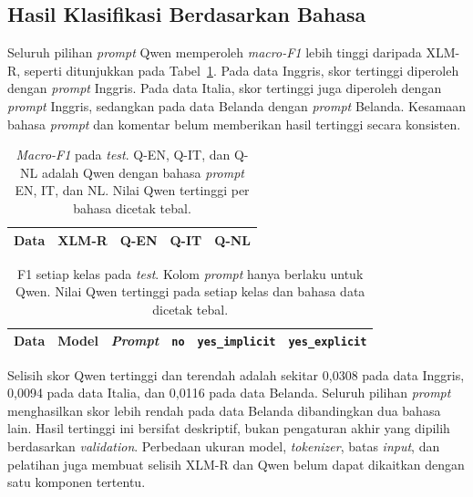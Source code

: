 \documentclass[11pt]{article}
\begin{document}
\subsection{Hasil Klasifikasi Berdasarkan Bahasa}
Seluruh pilihan \textit{prompt} Qwen memperoleh \textit{macro-F1} lebih tinggi daripada XLM-R, seperti ditunjukkan pada Tabel~\ref{tab:main}. Pada data Inggris, skor tertinggi diperoleh dengan \textit{prompt} Inggris. Pada data Italia, skor tertinggi juga diperoleh dengan \textit{prompt} Inggris, sedangkan pada data Belanda dengan \textit{prompt} Belanda. Kesamaan bahasa \textit{prompt} dan komentar belum memberikan hasil tertinggi secara konsisten.

\begin{table}[t]
\centering\small
\setlength{\tabcolsep}{2pt}
\begin{tabular}{lrrrr}
\toprule
Data & XLM-R & Q-EN & Q-IT & Q-NL \\
\midrule

\end{tabular}
\caption{\textit{Macro-F1} pada \textit{test}. Q-EN, Q-IT, dan Q-NL adalah Qwen dengan bahasa \textit{prompt} EN, IT, dan NL. Nilai Qwen tertinggi per bahasa dicetak tebal.}
\label{tab:main}
\end{table}

\begin{table}[t]
\centering\small
\begin{tabular}{lllrrr}
\toprule
Data & Model & \textit{Prompt} & \texttt{no} & \texttt{yes\_implicit} & \texttt{yes\_explicit} \\
\midrule

\end{tabular}
\caption{F1 setiap kelas pada \textit{test}. Kolom \textit{prompt} hanya berlaku untuk Qwen. Nilai Qwen tertinggi pada setiap kelas dan bahasa data dicetak tebal.}
\label{tab:classes}
\end{table}

Selisih skor Qwen tertinggi dan terendah adalah sekitar 0,0308 pada data Inggris, 0,0094 pada data Italia, dan 0,0116 pada data Belanda. Seluruh pilihan \textit{prompt} menghasilkan skor lebih rendah pada data Belanda dibandingkan dua bahasa lain. Hasil tertinggi ini bersifat deskriptif, bukan pengaturan akhir yang dipilih berdasarkan \textit{validation}. Perbedaan ukuran model, \textit{tokenizer}, batas \textit{input}, dan pelatihan juga membuat selisih XLM-R dan Qwen belum dapat dikaitkan dengan satu komponen tertentu.
\end{document}
